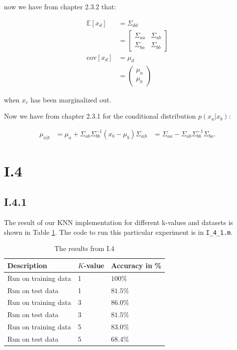 now we have from chapter 2.3.2 that:

\begin{align*}
	\mathbb{E}[x_d] &= \Sigma_{dd} \\
	&= \begin{bmatrix}
		\Sigma_{aa} & \Sigma_{ab} \\
		\Sigma_{ba} & \Sigma_{bb}
	   \end{bmatrix} \\
	\text{cov}[x_d] &= \mu_d \\
	&= \begin{pmatrix}
		\mu_a \\
		\mu_b
	   \end{pmatrix}
\end{align*}

when $x_c$ has been marginalized out.

Now we have from chapter 2.3.1 for the conditional distribution $p(x_a | x_b)$:

\begin{align*}
	\mu_{a|b} &= \mu_a + \Sigma_{ab} \Sigma_{bb}^{-1}(x_b - \mu_b)
	\Sigma_{a|b} &= \Sigma_{aa} - \Sigma_{ab} \Sigma_{bb}^{-1} \Sigma_{ba}.
\end{align*}

\pagebreak
\section{I.4}
\subsection{I.4.1}
The result of our KNN implementation for different k-values and datasets is
shown in Table \ref{tab:knn-res}. The code to run this particular experiment
is in \texttt{I\_4\_1.m}.
\begin{table}
\center
\begin{tabular}{|l|l|l|}
\hline
Description          & $K$-value & Accuracy in \% \\\hline
Run on training data & 1         & $100  \%$ \\
Run on test data     & 1         & $81.5 \%$ \\
Run on training data & 3         & $86.0 \%$ \\
Run on test data     & 3         & $81.5 \%$ \\
Run on training data & 5         & $83.0 \%$ \\
Run on test data     & 5         & $68.4 \%$ \\\hline
\end{tabular}
\caption{The results from I.4}
\label{tab:knn-res}
\end{table}

